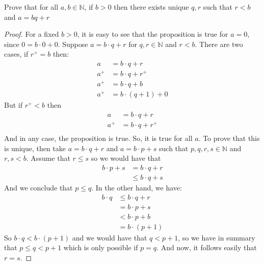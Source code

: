 \documentclass{tufte-handout}
\begin{document}
\begin{problem}
	Prove that for all $a, b \in \mathbb{N}$, if $b > 0$ then there exists unique $q, r$ such that $r < b$ and $a = bq + r$
\end{problem}
\begin{proof}
	For a fixed $b > 0$, it is easy to see that the proposition is true for $a = 0$, since $0 = b \cdot 0 + 0$. Suppose $a = b \cdot q + r$ for $q, r \in \mathbb{N}$ and $r < b$. There are two cases, if $r^+ = b$ then:
	\begin{align*}
		a &= b \cdot q + r\\
		a^+ &= b \cdot q + r^+\\
		a^+ &= b \cdot q + b\\
		a^+ &= b \cdot(q + 1) + 0
	\end{align*}
	But if $r^+ < b$ then
	\begin{align*}
		a &= b \cdot q + r\\
		a^+ &= b \cdot q + r^+\\
	\end{align*}
	And in any case, the proposition is true. So, it is true for all $a$. To prove that this is unique, then take $a = b \cdot q + r$ and $a = b \cdot p + s$ such that $p, q, r, s \in \mathbb{N}$ and $r, s < b$. Assume that $r \le s$ so we would have that
	\begin{align*}
		b \cdot p + s &= b \cdot q + r\\
		&\le b \cdot q + s 
	\end{align*}
	And we conclude that $p \le q$. In the other hand, we have:
	\begin{align*}
		b \cdot q &\le b \cdot q + r\\
		&= b\cdot p + s\\
		&< b\cdot p + b\\
		&= b\cdot(p + 1)
	\end{align*}
	So $b \cdot q < b \cdot (p + 1)$ and we would have that $ q < p +1$, so we have in summary that $p \le q < p + 1$ which is only possible if $p = q$. And now, it follows easily that $r = s$.
\end{proof}
\end{document}
